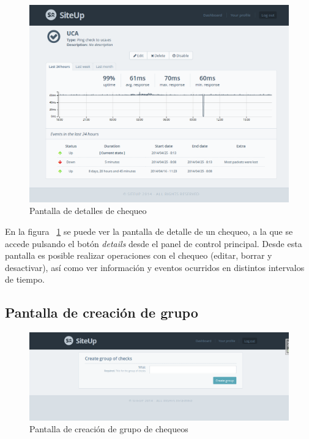 \begin{figure}[htbp]
  \centering
  \includegraphics[width=\textwidth]{5_diseno/web-check-detail.png}
  \caption{Pantalla de detalles de chequeo}
  \label{fig:web-check-detail}
\end{figure}

En la figura ~\ref{fig:web-check-detail} se puede ver la pantalla de detalle de
un chequeo, a la que se accede pulsando el botón \textit{details} desde el panel
de control principal. Desde esta pantalla es posible realizar operaciones con el
chequeo (editar, borrar y desactivar), así como ver información y eventos
ocurridos en distintos intervalos de tiempo.


\subsection{Pantalla de creación de grupo}

\begin{figure}[htbp]
  \centering
  \includegraphics[width=\textwidth]{5_diseno/web-create-group}
  \caption{Pantalla de creación de grupo de chequeos}
  \label{fig:web-create-group}
\end{figure}

